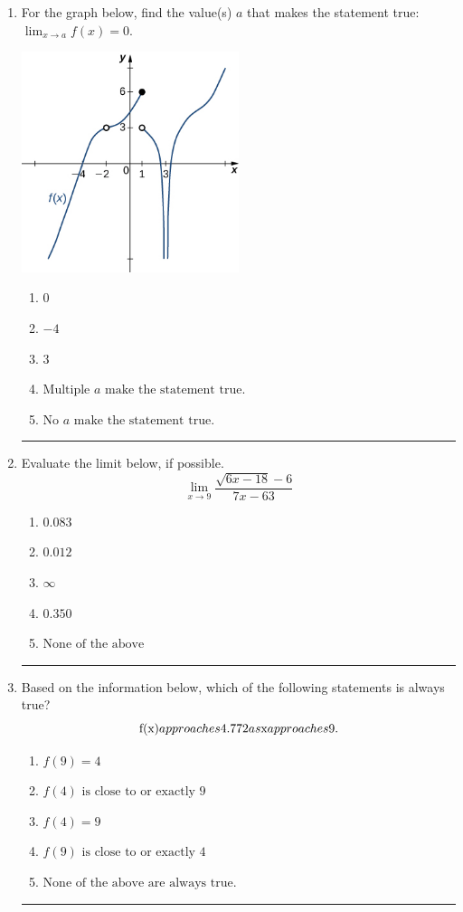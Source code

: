 \documentclass[14pt]{extbook}
\newcommand{\litem}[1]{\item#1\hspace*{-1cm}\rule{\textwidth}{0.4pt}}
\begin{document}
\begin{enumerate}
{\begin{enumerate}[label=\Alph*.]
\end{enumerate} }
\litem{
For the graph below, find the value(s) $a$ that makes the statement true: $ \displaystyle \lim_{x \rightarrow a} f(x) = 0$.
\begin{center}
    \includegraphics[width=0.5\textwidth]{../Figures/evaluateLimitGraphicallyA.png}
\end{center}
\begin{enumerate}[label=\Alph*.]
\item \( 0 \)
\item \( -4 \)
\item \( 3 \)
\item \( \text{Multiple } a \text{ make the statement true}. \)
\item \( \text{No } a \text{ make the statement true}. \)

\end{enumerate} }
\litem{
Evaluate the limit below, if possible.\[ \lim_{x \rightarrow 9} \frac{\sqrt{6x - 18} - 6}{7x - 63} \]\begin{enumerate}[label=\Alph*.]
\item \( 0.083 \)
\item \( 0.012 \)
\item \( \infty \)
\item \( 0.350 \)
\item \( \text{None of the above} \)

\end{enumerate} }
\litem{
Based on the information below, which of the following statements is always true?\[ $f(x)$ approaches $4.772$ as $x$ approaches $9$. \]\begin{enumerate}[label=\Alph*.]
\item \( f(9) = 4 \)
\item \( f(4) \text{ is close to or exactly } 9 \)
\item \( f(4) = 9 \)
\item \( f(9) \text{ is close to or exactly } 4 \)
\item \( \text{None of the above are always true.} \)

\end{enumerate} }
\end{enumerate}
\end{document}
